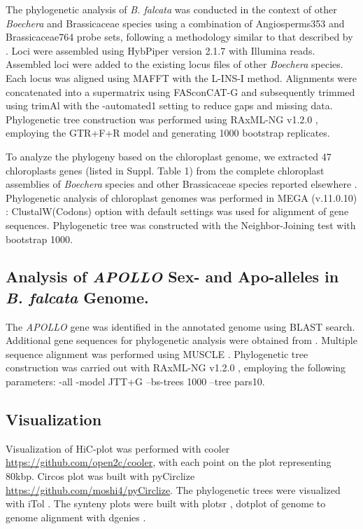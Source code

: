 \documentclass[9pt,twocolumn,twoside,lineno]{gsag3jnl}
\begin{document}
The phylogenetic analysis of \textit{B. falcata} was conducted in the context of other \textit{Boechera} and Brassicaceae species using a combination of Angiosperms353 and Brassicaceae764 probe sets, following a methodology similar to that described by \citep{hay2023}. Loci were assembled using HybPiper version 2.1.7 \citep{johnson2016hybpiper} with Illumina reads. Assembled loci were added to the existing locus files of other \textit{Boechera} species. Each locus was aligned using MAFFT \citep{katoh2008} with the L-INS-I method. Alignments were concatenated into a supermatrix using FASconCAT-G \citep{kuck2014fasconcat} and subsequently trimmed using trimAl \citep{capella2009trimal} with the -automated1 setting to reduce gaps and missing data. Phylogenetic tree construction was performed using RAxML-NG v1.2.0 \citep{kozlov2019raxml}, employing the GTR+F+R model and generating 1000 bootstrap replicates.

To analyze the phylogeny based on the chloroplast genome, we extracted 47 chloroplasts genes (listed in Suppl. Table 1) from the complete chloroplast assemblies of \textit{Boechera} species and other Brassicaceae species reported elsewhere \citep{zhu2021}. Phylogenetic analysis of chloroplast genomes was performed in MEGA (v.11.0.10) \citep{tamura2007mega4}: ClustalW(Codons) option with default settings was used for alignment of gene sequences. Phylogenetic tree was constructed with the Neighbor-Joining test with bootstrap 1000.

\subsection{Analysis of \textit{APOLLO} Sex- and Apo-alleles in \textit{B. falcata} Genome.}

The \textit{APOLLO} gene \citep{corral2013} was identified in the annotated genome using BLAST search. Additional gene sequences for phylogenetic analysis were obtained from \cite{bakin2022phylogenetic}. Multiple sequence alignment was performed using MUSCLE \citep{edgar2004}. Phylogenetic tree construction was carried out with RAxML-NG v1.2.0 \citep{kozlov2019raxml}, employing the following parameters: -all -model JTT+G --bs-trees 1000 --tree pars{10}.

\subsection{Visualization}

Visualization of HiC-plot was performed with cooler \url{https://github.com/open2c/cooler}, with each point on the plot representing 80kbp. Circos plot was built with pyCirclize \url{https://github.com/moshi4/pyCirclize}. The phylogenetic trees were visualized with iTol \citep{letunic2021}. The synteny plots were built with plotsr \citep{goel2022plotsr}, dotplot of genome to genome alignment with dgenies \citep{cabanettes2018}.
\end{document}
